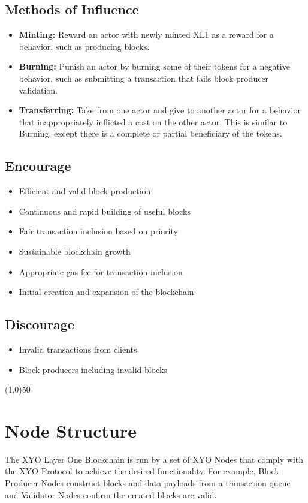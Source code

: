 \documentclass{article}
\begin{document}
\subsection{Methods of Influence}
\begin{itemize}
    \item \textbf{Minting:} Reward an actor with newly minted XL1 as a reward for a behavior, such as producing blocks.
    \item \textbf{Burning:} Punish an actor by burning some of their tokens for a negative behavior, such as submitting a transaction that fails block producer validation.
    \item \textbf{Transferring:} Take from one actor and give to another actor for a behavior that inappropriately inflicted a cost on the other actor. This is similar to Burning, except there is a complete or partial beneficiary of the tokens.
\end{itemize}

\subsection{Encourage}
\begin{itemize}
    \item Efficient and valid block production
    \item Continuous and rapid building of useful blocks
    \item Fair transaction inclusion based on priority
    \item Sustainable blockchain growth
    \item Appropriate gas fee for transaction inclusion
    \item Initial creation and expansion of the blockchain
\end{itemize}

\subsection{Discourage}
\begin{itemize}
    \item Invalid transactions from clients
    \item Block producers including invalid blocks
\end{itemize}

\begin{center}
    \line(1,0){50}
\end{center}

\section{Node Structure}
The XYO Layer One Blockchain is run by a set of XYO Nodes that comply with the
XYO Protocol to achieve the desired functionality. For example, Block Producer
Nodes construct blocks and data payloads from a transaction queue and Validator
Nodes confirm the created blocks are valid.
\end{document}

